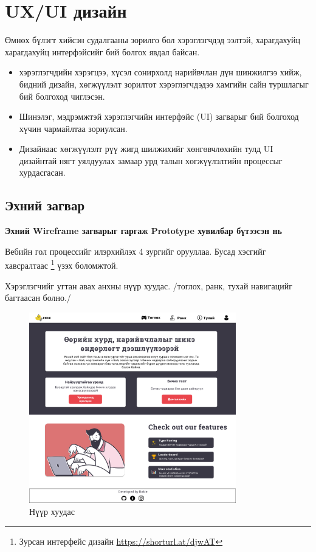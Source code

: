 \pagebreak
\section{UX/UI дизайн}

Өмнөх бүлэгт хийсэн судалгааны зорилго бол хэрэглэгчдэд ээлтэй, харагдахуйц харагдахуйц интерфэйсийг бий болгох явдал байсан.

\begin{itemize}
	\item хэрэглэгчдийн хэрэгцээ, хүсэл сонирхолд нарийвчлан дүн шинжилгээ хийж, бидний дизайн, хөгжүүлэлт зорилтот хэрэглэгчдэдээ хамгийн сайн туршлагыг бий болгоход чиглэсэн.
	\item Шинэлэг, мэдрэмжтэй хэрэглэгчийн интерфэйс (UI) загварыг бий болгоход хүчин чармайлтаа зориулсан.
	\item Дизайнаас хөгжүүлэлт рүү жигд шилжихийг хөнгөвчлөхийн тулд UI дизайнтай нягт уялдуулах замаар урд талын хөгжүүлэлтийн процессыг хурдасгасан.
\end{itemize}

\subsection{Эхний загвар}

\textbf{Эхний Wireframe загварыг гаргаж Prototype хувилбар бүтээсэн нь}

Вебийн гол процессийг илэрхийлэх 4 зургийг орууллаа. Бусад хэсгийг хавсралтаас \footnote{Зурсан интерфейс дизайн \url{https://shorturl.at/djwAT}} үзэх боломжтой.

\pagebreak
Хэрэглэгчийг угтан авах анхны нүүр хуудас. /тоглох, ранк, тухай навигацийг багтаасан болно./

\begin{figure}[h]
	\centering
	\includegraphics[width=9cm]{images/interfaces/ver1/mainpage.png}
	\caption{Нүүр хуудас}
	\label{fig:interface-v1-01}
\end{figure}

